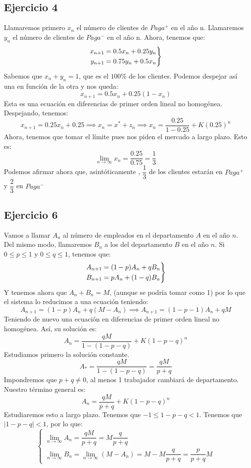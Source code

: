 \documentclass[11pt, a4paper, titlepage]{article}
\theoremstyle{theorem-style}
\theoremstyle{definition-style}
\theoremstyle{remark-style}
\theoremstyle{example-style}
\newenvironment{rcases}
  {\left.\begin{aligned}}
  {\end{aligned}\right\rbrace}
\begin{document}
\subsection{Ejercicio 4}
Llamaremos primero $x_n$ el número de clientes de $Paga^+$ en el año n.
Llamaremos $y_n$ el número de clientes de $Paga^-$ en el año n.
Ahora, tenemos que:
\[
\begin{rcases}
	x _{n+1} =0.5 x_n + 0.25 y_n \\
	y _{n+1} = 0.75 y_n +  0.5 x_n 
\end{rcases}
\]
Sabemos que $x_n+y_n = 1$, que es el $100\%$ de los clientes. Podemos despejar así una en función de la otra y nos queda:
\[
x _{n+1} = 0.5 x_n + 0.25(1-x_n)
\]
Esta es una ecuación en diferencias de primer orden lineal no homogénea. Despejando, tenemos:
\[
x _{n+1} = 0.25 x_n +0.25 \implies x_n =  x^* + z_n \implies x_n =  \dfrac{0.25}{1-0.25} + K(0.25)^n
\]
Ahora, tenemos que tomar el límite pues nos piden el mercado a largo plazo. Esto es:
\[
\lim_{n\to \infty}x_n = \dfrac{0.25}{0.75} = \dfrac{1}{3}
\]
Podemos afirmar ahora que, asintóticamente , $\dfrac{1}{3}$ de los clientes estarán en $Paga^+$ y $\dfrac{2}{3}$ en $Paga^-$

\subsection{Ejercicio 6}
Vamos a llamar $A_n$ al número de empleados en el departamento $A$ en el año $n$. Del mismo modo, llamaremos $B_n$ a los del departamento $B$ en el año $n$. Si $0 \leq p \leq 1$  y $0 \leq q \leq 1$, tenemos que:
\[
\begin{rcases}
	A _{n+1} = (1-p)A_n + qB_n\\
	B _{n+1}= pA_n + (1-q)B_n
\end{rcases}
\]
Y tenemos ahora que $A_n + B_n = M$, (aunque se podría tomar como 1) por lo que el sistema lo reducimos a una ecuación teniendo:
\[
A _{n+1} = (1-p)A_n +q(M-A_n)\implies A _{n+1} =(1-p-1)A_n +qM
\]
Teniendo de nuevo una ecuación en diferencias de primer orden lineal no homogénea. Así, su solución es:
\[
A_n = \dfrac{qM}{1-(1-p-q)} + K(1-p-q)^n
\]
Estudiamos primero la solución constante.
\[
A_* = \dfrac{qM}{1-(1-p-q)}= \dfrac{qM}{p+q}
\]
Impondremos que $p+q\ne 0$, al menos 1 trabajador cambiará de departamento.
Nuestro término general es:
\[
A_n = \dfrac{qM}{p+q} + K(1-p-q)^n
\]
Estudiaremos esto a largo plazo. Tenemos que $-1 \leq 1-p-q < 1$. Tenemos que $|1-p-q| < 1$, por lo que:
\[ \begin{cases}
	\lim_{n \to \infty} A_n = \dfrac{qM}{p+q} = M \dfrac{q}{p+q}\\
	\lim_{n \to \infty}B_n = \lim_{n\to \infty}(M-A_n) = M- M \dfrac{q}{p+q} = \dfrac{p}{p+q}M
\end{cases}
\]
\end{document}
